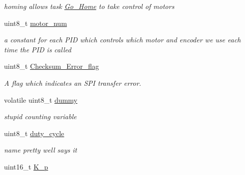 \begin{DoxyCompactItemize}
\begin{DoxyCompactList}\small\item\em homing allows task \hyperlink{class_go___home}{Go\-\_\-\-Home} to take control of motors \end{DoxyCompactList}\item 
\hypertarget{classtask___p_i_d_aabeac3edf9b1dc94f9e216ab99d89798}{uint8\-\_\-t \hyperlink{classtask___p_i_d_aabeac3edf9b1dc94f9e216ab99d89798}{motor\-\_\-num}}\label{classtask___p_i_d_aabeac3edf9b1dc94f9e216ab99d89798}

\begin{DoxyCompactList}\small\item\em a constant for each P\-I\-D which controls which motor and encoder we use each time the P\-I\-D is called \end{DoxyCompactList}\item 
\hypertarget{classtask___p_i_d_a3aad6e651da5110ea8d64971272d611b}{uint8\-\_\-t \hyperlink{classtask___p_i_d_a3aad6e651da5110ea8d64971272d611b}{Checksum\-\_\-\-Error\-\_\-flag}}\label{classtask___p_i_d_a3aad6e651da5110ea8d64971272d611b}

\begin{DoxyCompactList}\small\item\em A flag which indicates an S\-P\-I transfer error. \end{DoxyCompactList}\item 
\hypertarget{classtask___p_i_d_a40708de7482ae8000f09de573757b763}{volatile uint8\-\_\-t \hyperlink{classtask___p_i_d_a40708de7482ae8000f09de573757b763}{dummy}}\label{classtask___p_i_d_a40708de7482ae8000f09de573757b763}

\begin{DoxyCompactList}\small\item\em stupid counting variable \end{DoxyCompactList}\item 
\hypertarget{classtask___p_i_d_a0ed9811d402294a2e97513d17603cbde}{uint8\-\_\-t \hyperlink{classtask___p_i_d_a0ed9811d402294a2e97513d17603cbde}{duty\-\_\-cycle}}\label{classtask___p_i_d_a0ed9811d402294a2e97513d17603cbde}

\begin{DoxyCompactList}\small\item\em name pretty well says it \end{DoxyCompactList}\item 
\hypertarget{classtask___p_i_d_a819c45f7b06d30c0c259434e519920df}{uint16\-\_\-t \hyperlink{classtask___p_i_d_a819c45f7b06d30c0c259434e519920df}{K\-\_\-p}}\label{classtask___p_i_d_a819c45f7b06d30c0c259434e519920df}


\end{DoxyCompactItemize}
